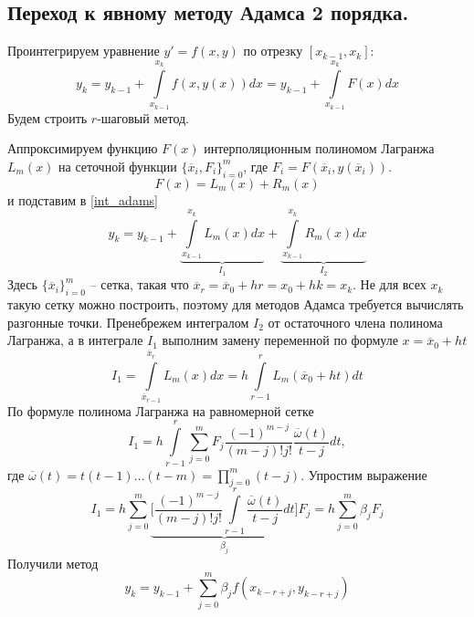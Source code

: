 \documentclass[a4paper, 12pt]{article}
\begin{document}
	\subsection{Переход к явному методу Адамса 2 порядка.}
	
	Проинтегрируем уравнение $y'=f(x,y)$ по отрезку $[x_{k-1}, x_k]$:
	\begin{equation} \label{int_adams}
		y_k=y_{k-1}+\int\limits_{x_{k-1}}^{x_k}f(x,y(x))dx=y_{k-1}+\int\limits_{x_{k-1}}^{x_k}F(x)dx
	\end{equation}
	Будем строить $r$-шаговый метод.
	
	Аппроксимируем функцию $F(x)$ интерполяционным полиномом Лагранжа $L_m(x)$ на сеточной функции $\{\overline{x}_i, F_i\}_{i=0}^m$, где $F_i= F(\overline{x}_i,y(\overline{x}_i))$.
	\begin{equation}
		F(x) = L_m(x) + R_m(x)
	\end{equation} 
	и подставим в \eqref{int_adams}
	\begin{equation}
		y_k=y_{k-1}+\underbrace{\int\limits_{x_{k-1}}^{x_k}L_m(x)dx}_{I_1} + \underbrace{\int\limits_{x_{k-1}}^{x_k}R_m(x)dx}_{I_2}
	\end{equation}
	Здесь $\{\overline{x}_i\}_{i=0}^m$ -- сетка, такая что $\overline{x}_r=\overline{x}_0+hr=x_0+hk=x_k$. Не для всех $x_k$ такую сетку можно построить, поэтому для методов Адамса требуется вычислять разгонные точки.
	Пренебрежем интегралом $I_2$ от остаточного члена полинома Лагранжа, а в интеграле $I_1$ выполним замену переменной по формуле $x=\overline{x}_0+ht$
	\begin{equation}
		I_1=\int\limits_{\overline{x}_{r-1}}^{\overline{x}_r}L_m(x)dx=h\int\limits_{r-1}^{r}L_m(\overline{x}_0+ht)dt
	\end{equation}
	По формуле полинома Лагранжа на равномерной сетке
	\begin{equation}
		I_1=h\int\limits_{r-1}^{r}\sum\limits_{j=0}^mF_j\frac{(-1)^{m-j}}{(m-j)!j!}\frac{\overline{\omega}(t)}{t-j}dt,
	\end{equation}
	где $\displaystyle \overline{\omega}(t)=t(t-1)\dots(t-m)=\prod\limits_{j=0}^m(t-j)$. Упростим выражение
	\begin{equation}
		I_1=h\sum\limits_{j=0}^m\underbrace{\bigg[\frac{(-1)^{m-j}}{(m-j)!j!}\int\limits_{r-1}^r\frac{\overline{\omega}(t)}{t-j}dt\bigg]}_{\beta_j}F_j=h\sum\limits_{j=0}^m\beta_{j}F_j
	\end{equation}
	Получили метод
	\begin{equation}
		y_{k}=y_{k-1}+\sum\limits_{j=0}^m\beta_jf(x_{k-r+j}, y_{k-r+j})
	\end{equation}
\end{document}
